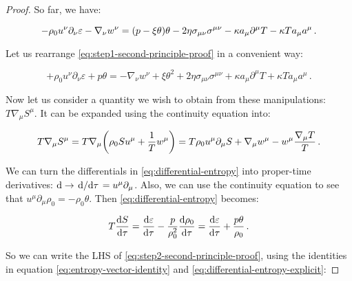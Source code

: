 \documentclass[main.tex]{subfiles}
\begin{document}
\begin{proof}
    So far, we have:

    \begin{equation} \label{eq:step1-second-principle-proof}
        - \rho_0 u^\nu \partial_\nu \varepsilon
        - \nabla_\nu w^\nu
        = \qty(p - \xi \theta) \theta - 2 \eta \sigma_{\mu\nu} \sigma^{\mu\nu}
        - \kappa a_\mu \partial^\mu T - \kappa T a_\mu a^\mu \,.
    \end{equation}

    Let us rearrange \eqref{eq:step1-second-principle-proof} in a convenient way:

    \begin{equation} \label{eq:step2-second-principle-proof}
        + \rho_0 u^\nu \partial_\nu \varepsilon + p \theta =
        - \nabla_\nu w^\nu
        + \xi \theta^2 + 2 \eta \sigma_{\mu\nu} \sigma^{\mu\nu}
        + \kappa a_\mu \partial^\mu T + \kappa T a_\mu a^\mu \,.
    \end{equation}

    Now let us consider a quantity we wish to obtain from these manipulations:
    \(T \nabla_\mu S^\mu\). It can be expanded using the continuity equation into:

    \begin{equation} \label{eq:entropy-vector-identity}
        T \nabla_\mu S^\mu
        = T \nabla_\mu \qty(\rho_0 S u^\mu + \frac 1T w^\mu )
        = T \rho_0 u^\mu \partial_\mu S + \nabla_\mu w^\mu - w^\mu \frac{\nabla_\mu T}{T} \,.
    \end{equation}

    We can turn the differentials in \eqref{eq:differential-entropy} into proper-time derivatives: \(\dd \rightarrow \dv*{}{\tau} = u^\mu \partial_\mu \). Also, we can use the continuity equation to see that \(u^\mu \partial_\mu \rho_0 = - \rho_0 \theta\).
    Then \eqref{eq:differential-entropy} becomes:

    \begin{equation} \label{eq:differential-entropy-explicit}
        T \dv{S}{\tau}  = \dv{\varepsilon}{\tau} - \frac{p}{\rho_0^2} \dv{\rho_0}{\tau}  =\dv{\varepsilon}{\tau} + \frac{p \theta}{\rho_0} \,.
    \end{equation}

    So we can write the LHS of \eqref{eq:step2-second-principle-proof}, using the identities in
    equation \eqref{eq:entropy-vector-identity} and \eqref{eq:differential-entropy-explicit}:


\end{proof}
\end{document}
